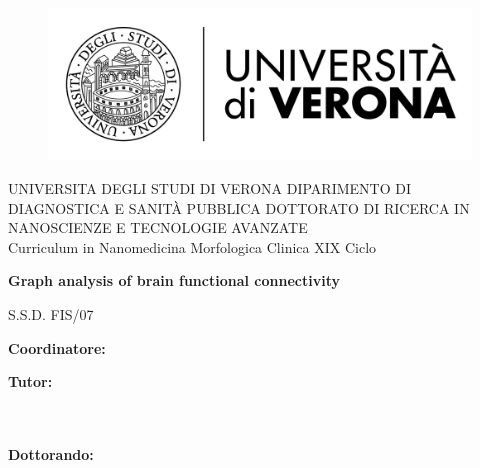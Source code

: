 
\begin{titlepage}
    \begin{figure}[!h]
    \flushleft
	\includegraphics[width=0.3\columnwidth]{images/univr.png}
	\end{figure}

    \begin{center}
    	\large
        UNIVERSITA DEGLI STUDI DI VERONA
        \hfill
        \vfill
		DIPARIMENTO DI DIAGNOSTICA E SANIT\`A PUBBLICA
		\vfill
		DOTTORATO DI RICERCA IN NANOSCIENZE E TECNOLOGIE AVANZATE\\Curriculum in Nanomedicina Morfologica Clinica
		\vfill
		XIX Ciclo

		\vfill

        \begingroup
       		\huge\bf
            Graph analysis of brain functional connectivity
            \bigskip
        \endgroup

        \vfill
        S.S.D. FIS/07

		\flushleft 
		\normalsize{\bf{Coordinatore}:}\\

		\flushleft
		\normalsize{\bf{Tutor}:}\\
		\\
		\\
		        
        \vfill  
        
        \flushright
        \normalsize{\textbf{Dottorando:}}\\
        \\
				
		\vfill 


    \end{center}  
\end{titlepage}

